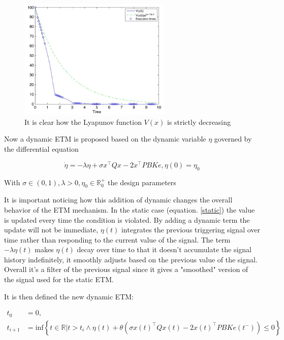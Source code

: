 \documentclass[12pt]{article}
\begin{document}
\begin{figure}[H]
    \centering
    \includegraphics[width=0.65\textwidth]{img/static}
    \caption{It is clear how the Lyapunov function $V(x)$ is strictly decreasing}
    \label{static-plot}
\end{figure}


Now a dynamic ETM is proposed based on the dynamic variable $\eta$ governed by the differential equation

\begin{equation}
  \dot{\eta} = - \lambda \eta + \sigma x^{\top} Q x - 2 x^{\top} P B K e, \eta(0) = \eta_0
\end{equation}

With $\sigma \in \left( 0, 1 \right), \lambda > 0, \eta_0 \in \mathbb{R}^{+}_0$ the design parameters

It is important noticing how this addition of dynamic changes the overall behavior of the ETM mechanism. In the static case (equation. \ref{static}) the value is updated every time the condition is violated. By adding a dynamic term the update will not be immediate, $\eta(t)$ integrates the previous triggering signal over time rather than responding to the current value of the signal. The term $-\lambda \eta(t)$ makes $\eta(t)$ decay over time to that it doesn't accumulate the signal history indefinitely, it smoothly adjusts based on the previous value of the signal. Overall it's a filter of the previous signal since it gives a "smoothed" version of the signal used for the static ETM.

It is then defined the new dynamic ETM:


\begin{align} \label{dynamic}
  t_0 &= 0, \nonumber \\
  t_{i+1} &= \text{inf} \left\{
  t \in \mathbb{R} | t > t_i \wedge \eta(t) + \theta \left(  \sigma x(t)^{\top} Q x(t) - 2 x(t)^{\top} P B K e(t^{-} ) \right) \leq 0
  \right\}
\end{align}
\end{document}
